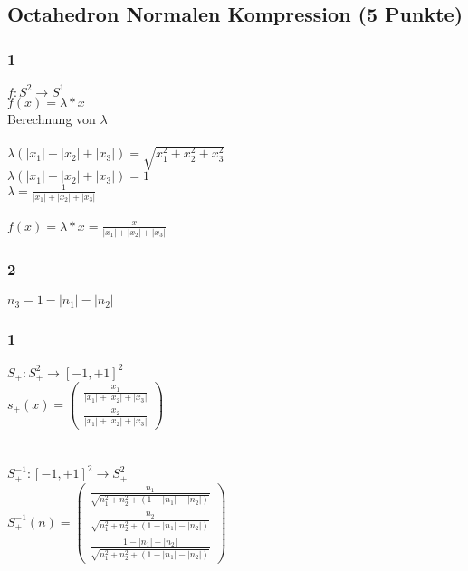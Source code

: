 \newif\ifvimbug
\vimbugfalse

\ifvimbug

\fi


\subsection{Octahedron Normalen Kompression (5 Punkte)}
\subsubsection{1}
$f: S^{2} \rightarrow S^{1}$\\
$f(x) = \lambda * x$\\
Berechnung von $\lambda$\\
\\
$\lambda(|x_{1}| + |x_{2}| + |x_{3}|) = \sqrt{x_{1}^{2} + x_{2}^{2} + x_{3}^{2}}$\\
$\lambda(|x_{1}| + |x_{2}| + |x_{3}|) = 1$\\
$\lambda = \frac{1}{|x_{1}| + |x_{2}| + |x_{3}|}$\\
\\
$ f(x) = \lambda * x = \frac{x}{|x_{1}| + |x_{2}| + |x_{3}|}$
\subsubsection{2}
$n_{3} = 1 - |n_{1}| - |n_{2}|$
\subsubsection{1}
$S_{+}: S_{+}^{2} \rightarrow [-1, +1]^{2}$\\
$s_{+}(x) = \begin{pmatrix}
\frac{x_{1}}{|x_{1}| + |x_{2}| + |x_{3}|} \\ 
\frac{x_{2}}{|x_{1}| + |x_{2}| + |x_{3}|}
\end{pmatrix} $\\
\\
\\
$S_{+}^{-1}: [-1, +1]^{2} \rightarrow S_{+}^{2}$\\
$S_{+}^{-1}(n) = \begin{pmatrix}
\frac{n_{1}}{\sqrt{n_{1}^{2} + n_{2}^{2} + (1 - |n_{1}| - |n_{2}|)}} \\ 
\frac{n_{2}}{\sqrt{n_{1}^{2} + n_{2}^{2} + (1 - |n_{1}| - |n_{2}|)}} \\ 
\frac{1 - |n_{1}| - |n_{2}|}{\sqrt{n_{1}^{2} + n_{2}^{2} + (1 - |n_{1}| - |n_{2}|)}}
\end{pmatrix} $
